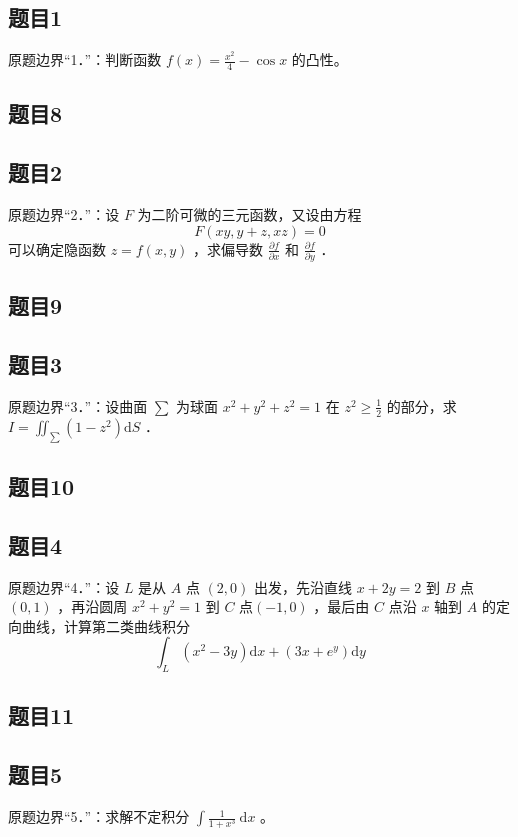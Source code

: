 \documentclass{article}
\begin{document}
\subsection{题目1}
原题边界“1．”：判断函数 \(f(x)=\frac{x^{2}}{4}-\cos x\) 的凸性。

\subsection{题目8}

\subsection{题目2}
原题边界“2．”：设 \(F\) 为二阶可微的三元函数，又设由方程
\[
F(x y, y+z, x z)=0
\]
可以确定隐函数 \(z=f(x, y)\) ，求偏导数 \(\frac{\partial f}{\partial x}\) 和 \(\frac{\partial f}{\partial y}\) ．

\subsection{题目9}

\subsection{题目3}
原题边界“3．”：设曲面 \(\sum\) 为球面 \(x^{2}+y^{2}+z^{2}=1\) 在 \(z^{2} \geq \frac{1}{2}\) 的部分，求 \(I=\iint_{\sum}\left(1-z^{2}\right) \mathrm{d} S\) ．

\subsection{题目10}

\subsection{题目4}
原题边界“4．”：设 \(L\) 是从 \(A\) 点 \((2,0)\) 出发，先沿直线 \(x+2 y=2\) 到 \(B\) 点 \((0,1)\) ，再沿圆周 \(x^{2}+y^{2}=1\) 到 \(C\) 点\((-1,0)\) ，最后由 \(C\) 点沿 \(x\) 轴到 \(A\) 的定向曲线，计算第二类曲线积分
\[
\int_{L}\left(x^{2}-3 y\right) \mathrm{d} x+\left(3 x+e^{y}\right) \mathrm{d} y
\]

\subsection{题目11}

\subsection{题目5}
原题边界“5．”：求解不定积分 \(\int \frac{1}{1+x^{3}} \mathrm{~d} x\) 。
\end{document}
